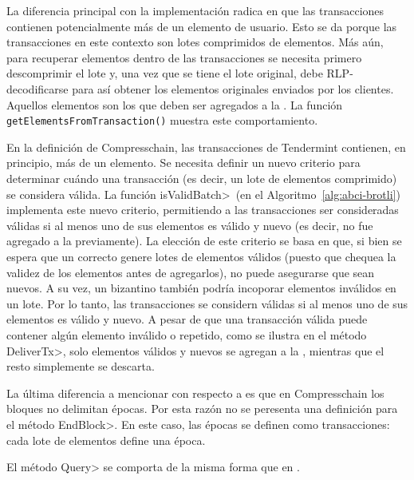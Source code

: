 La diferencia principal con la implementación \vanilla radica en que las transacciones contienen
potencialmente más de un elemento de usuario. Esto se da porque las transacciones en este contexto
son lotes comprimidos de elementos.
%
Más aún, para recuperar elementos dentro de las transacciones se necesita primero descomprimir
el lote y, una vez que se tiene el lote original, debe RLP-decodificarse para así obtener los elementos
originales enviados por los clientes.
%
Aquellos elementos son los que deben ser agregados a la \setchain. La función \texttt{getElementsFromTransaction()}
muestra este comportamiento.

En la definición de Compresschain, las transacciones de Tendermint contienen, en principio, más de un elemento.
%
Se necesita definir un nuevo criterio para determinar cuándo una transacción (es decir, un lote de elementos
comprimido) se considera válida.
%
La función \<isValidBatch>~(en el Algoritmo~\ref{alg:abci-brotli}) implementa este nuevo criterio, permitiendo
a las transacciones ser consideradas válidas si al menos uno de sus elementos es válido y nuevo (es decir,
no fue agregado a la \setchain previamente).
%
La elección de este criterio se basa en que, si bien se espera
que un \collector correcto genere lotes de elementos válidos (puesto que chequea la validez de los elementos
antes de agregarlos), no puede asegurarse que sean nuevos.
A su vez, un \collector bizantino también podría incoporar elementos inválidos en un lote.
%
Por lo tanto, las transacciones se considern válidas si al menos uno de sus elementos es válido y nuevo.
%
A pesar de que una transacción válida puede contener algún elemento inválido o repetido,
como se ilustra en el método \<DeliverTx>, solo elementos válidos y nuevos se agregan a la \setchain,
mientras que el resto simplemente se descarta.
%

La última diferencia a mencionar con respecto a \vanilla es que en Compresschain los bloques no delimitan épocas.
Por esta razón no se peresenta una definición para el método \<EndBlock>.
En este caso, las épocas se definen como transacciones: cada lote de elementos define una época.

%
El método \<Query> se comporta de la misma forma que en \vanilla.

